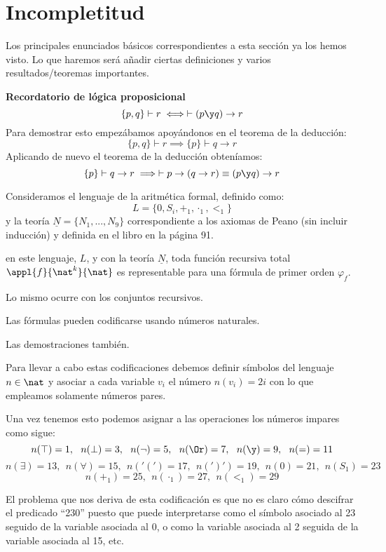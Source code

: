 \section{Incompletitud}

Los principales enunciados básicos correspondientes a esta sección ya los hemos visto. Lo que haremos será añadir ciertas definiciones y varios resultados/teoremas importantes.

\textbf{Recordatorio de lógica proposicional}
\[\{p,q\}\vdash r \iff \vdash (p\y q) \to r\]
Para demostrar esto empezábamos apoyándonos en el teorema de la deducción:
\[\{p,q\} \vdash r \implies \{p\} \vdash q \to r\]
Aplicando de nuevo el teorema de la deducción obteníamos:
\[\{p\} \vdash q \to r \implies \vdash p \to (q \to r) \equiv (p \y q ) \to r\]

\begin{theorem}
Consideramos el lenguaje de la aritmética formal, definido como:
\[L=\{0,S_i,+_1,\cdot_1, <_1\}\]
y la teoría $\underline{N}=\{N_1,...,N_9\}$ correspondiente a los axiomas de Peano (sin incluir inducción) y definida en el libro en la página 91.

en este lenguaje, $L$, y con la teoría $\underline{N}$, toda función recursiva total $\appl{f}{\nat^k}{\nat}$ es representable para una fórmula de primer orden $\varphi_f$.

Lo mismo ocurre con los conjuntos recursivos.
\end{theorem}

\begin{prop}[Codificación]
Las fórmulas pueden codificarse usando números naturales.

Las demostraciones también.

\end{prop}

Para llevar a cabo estas codificaciones debemos definir símbolos del lenguaje $n \in \nat$ y asociar a cada variable $v_i$ el número $n(v_i)=2i$ con lo que empleamos solamente números pares.

Una vez tenemos esto podemos asignar a las operaciones los números impares como sigue:
\[n(\top) = 1, \ \ n(\perp)=3, \ \ n(\neg) = 5, \ \ n(\Or) = 7, \ \ n(\y)=9, \ \ n(=)=11\]
\[n(\exists)=13, \ \ n(\forall) =15, \ \ n('(')=17, \ \ n(')')=19, \ \ n(0)=21, \ \ n(S_1)=23\]
\[n(+_1)=25, \ \ n(\cdot_1)=27, \ \ n(<_1) = 29\]

El problema que nos deriva de esta codificación es que no es claro cómo descifrar el predicado ``230'' puesto que puede interpretarse como el símbolo asociado al 23 seguido de la variable asociada al 0, o como la variable asociada al 2 seguida de la variable asociada al 15, etc.

